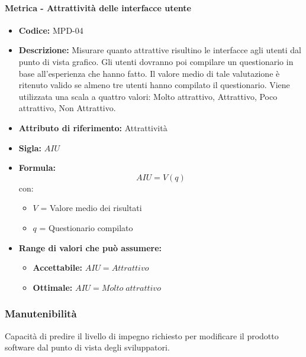     \paragraph{Metrica - Attrattività delle interfacce utente} 
        \begin{itemize}
          \item  \textbf{Codice: } MPD-04
          \item  \textbf{Descrizione:} Misurare quanto attrattive risultino le interfacce agli utenti dal punto di vista grafico. Gli utenti dovranno poi compilare 
          un questionario in base all'esperienza che hanno fatto. Il valore medio di tale valutazione è ritenuto valido se almeno tre utenti hanno compilato il questionario. 
          Viene utilizzata una scala a quattro valori: Molto attrattivo, Attrattivo, Poco attrattivo, Non Attrattivo.
          \item  \textbf{Attributo di riferimento:} Attrattività
          \item  \textbf{Sigla:} $AIU$
           \item \textbf{Formula:}$$AIU = V (q) $$
           con:
        \begin{itemize}
            \item $V$ = Valore medio dei risultati
            \item $q$ = Questionario compilato
        \end{itemize}

        \item \textbf{Range di valori che può assumere:}
        \begin{itemize}
            \item \textbf{Accettabile:} $AIU = Attrattivo$ 
            \item \textbf{Ottimale:} $AIU = Molto \; attrattivo$
        \end{itemize}
    \end{itemize}


        \subsubsection{Manutenibilità} 
    Capacità di predire il livello di impegno richiesto per modificare il prodotto software dal punto di vista degli sviluppatori.
    

